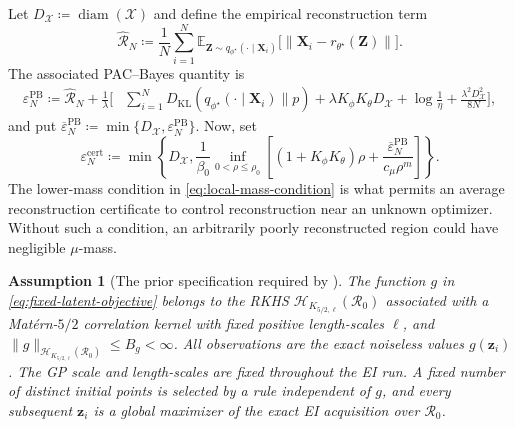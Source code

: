\documentclass[pdflatex,sn-mathphys-num]{sn-jnl}%
\theoremstyle{thmstyleone}%
\newtheorem{assumption}[theorem]{Assumption}
\theoremstyle{thmstyletwo}%
\theoremstyle{thmstylethree}%
\begin{document}
Let $D_{\mathcal{X}} \coloneq \operatorname{diam}(\mathcal{X})$ and define the empirical reconstruction term
\begin{equation}
  \widehat{\mathcal{R}}_N
   \coloneq \frac{1}{N}\sum_{i=1}^N
    \mathbb{E}_{\mathbf{Z}\sim q_{\phi^\star}(\cdot\mid\mathbf{X}_i)}
      \bigl[\|\mathbf{X}_i-r_{\theta^\star}(\mathbf{Z})\|\bigr].
  \label{eq:empirical-reconstruction-certificate}
\end{equation}
The associated PAC--Bayes quantity is
\begin{align}
  \varepsilon_N^{\mathrm{PB}}
   \coloneq \widehat{\mathcal{R}}_N
  +\frac{1}{\lambda}\biggl[
    &\sum_{i=1}^N
      D_{\mathrm{KL}}\!\left(q_{\phi^\star}(\cdot\mid\mathbf{X}_i)\|p\right)
      +\lambda K_\phi K_\theta D_{\mathcal{X}}
      +\log\frac{1}{\eta}
      +\frac{\lambda^2D_{\mathcal{X}}^2}{8N}
  \biggr],
  \label{eq:pac-bayes-certificate}
\end{align}
and put $\overline\varepsilon_N^{\mathrm{PB}} \coloneq \min\{D_{\mathcal{X}},\varepsilon_N^{\mathrm{PB}}\}$.  Now, set
\begin{equation}
  \varepsilon_N^{\mathrm{cert}}
   \coloneq \min\left\{
    D_{\mathcal{X}},
    \frac{1}{\beta_0}
    \inf_{0<\rho\leq\rho_0}
    \left[
      (1+K_\phi K_\theta)\rho
      +\frac{\overline\varepsilon_N^{\mathrm{PB}}}
             {c_\mu\rho^m}
    \right]
  \right\}.
  \label{eq:uniform-reconstruction-certificate}
\end{equation}
The lower-mass condition in \eqref{eq:local-mass-condition} is what permits an average reconstruction certificate to control reconstruction near an unknown optimizer. Without such a condition, an arbitrarily poorly reconstructed region could have negligible $\mu$-mass.

\begin{assumption}[The prior specification required by \cite{bull2011ego}]
\label{ass:fixed-prior-ei}
The function $g$ in \eqref{eq:fixed-latent-objective} belongs to the RKHS $\mathcal{H}_{K_{5/2,\ell}}(\mathcal{R}_0)$ associated with a Mat\'ern-$5/2$ correlation kernel with fixed positive length-scales $\ell$, and $\|g\|_{\mathcal{H}_{K_{5/2,\ell}}(\mathcal{R}_0)}\leq B_g<\infty$.  All observations are the exact noiseless values $g(\mathbf{z}_i)$. The GP scale and length-scales are fixed throughout the EI run. A fixed number of distinct initial points is selected by a rule independent of $g$, and every subsequent $\mathbf{z}_i$ is a global maximizer of the exact EI acquisition over $\mathcal{R}_0$.
\end{assumption}
\end{document}
